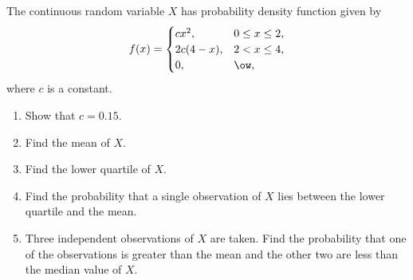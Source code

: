 \begin{problem}
    The continuous random variable $X$ has probability density function given by \[f(x) = \begin{cases}
        cx^2, & 0 \leq x \leq 2,\\
        2c(4-x), & 2 < x \leq 4,\\
        0, & \ow,
    \end{cases}\] where $c$ is a constant.

    \begin{enumerate}
        \item Show that $c=0.15$.
        \item Find the mean of $X$.
        \item Find the lower quartile of $X$.
        \item Find the probability that a single observation of $X$ lies between the lower quartile and the mean.
        \item Three independent observations of $X$ are taken. Find the probability that one of the observations is greater than the mean and the other two are less than the median value of $X$.
    \end{enumerate}
\end{problem}
